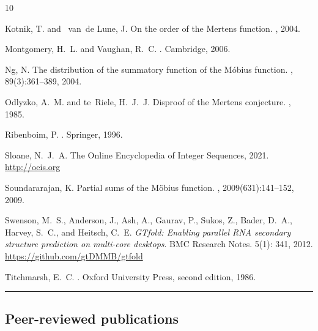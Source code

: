 \documentclass[10pt,reqno,letterpaper]{article}
\theoremstyle{plain}
\numberwithin{theorem}{section}
\theoremstyle{definition}
\newcounter{completeBibitemIncrementCtr}
\renewenvironment{thebibliography}[1]{
     \renewcommand{\refname}{} 
     
     \begin{oldthebibliography}{#1}
     \setlength{\itemsep}{0em}
     \setlength{\parskip}{0em}
     \setlength{\topsep}{0pt}
     \setlength{\partopsep}{0pt}
     \setcounter{enumiv}{\value{completeBibitemIncrementCtr}}
     \footnotesize 
}
{
     \setcounter{completeBibitemIncrementCtr}{\value{enumiv}}
     \end{oldthebibliography}
}
\begin{document}
\begin{thebibliography}{10}
Kotnik, T. and ~van~de Lune, J.
\newblock On the order of the {M}ertens function.
, 2004.

Montgomery, H.~L. and Vaughan, R.~C.
.
\newblock Cambridge, 2006.

Ng, N.
\newblock The distribution of the summatory function of the {M}{\'{o}}bius
  function.
, 89(3):361--389, 2004.

Odlyzko, A.~M. and te~Riele, H.~J.~J. 
\newblock Disproof of the {M}ertens conjecture.
, 1985.

Ribenboim, P.
.
\newblock Springer, 1996.

Sloane, N.~J.~A.
\newblock The {O}nline {E}ncyclopedia of {I}nteger {S}equences, 2021.
\newblock \url{http://oeis.org}

Soundararajan, K.
\newblock Partial sums of the {M}{\"{o}}bius function.
, 2009(631):141--152, 2009.

Swenson, M.~S., Anderson, J., Ash, A., Gaurav, P., Sukos, Z., Bader, D.~A., 
Harvey, S.~C., and Heitsch, C.~E. 
\emph{GTfold: Enabling parallel RNA secondary structure prediction on multi-core desktops}. 
BMC Research Notes. 5(1): 341, 2012. 
\url{https://github.com/gtDMMB/gtfold} 

Titchmarsh, E.~C.
.
\newblock Oxford University Press, second edition, 1986.

\end{thebibliography}


\bigskip\hrule\bigskip
\subsection{Peer-reviewed publications} 
\label{page_BibliographyB_subSection_MDSPubs} 
\end{document}
